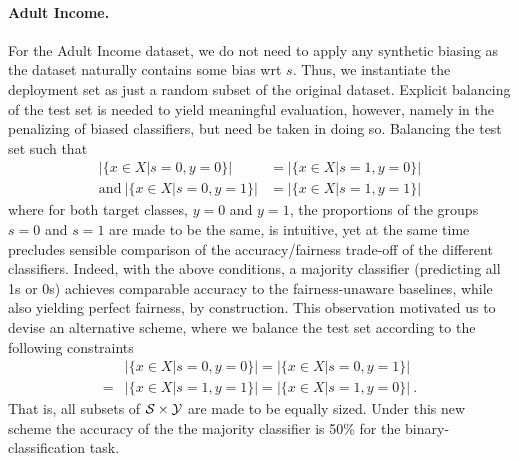 \paragraph{Adult Income.}\label{ssec:dataset-construction-adult}
For the Adult Income dataset, we do not need to apply any synthetic biasing as the dataset naturally contains some bias wrt $s$. Thus, we instantiate the deployment set as just a random subset of the original dataset. Explicit balancing of the test set is needed to yield meaningful evaluation, however, namely in the penalizing of biased classifiers, but need be taken in doing so. Balancing the test set such that
\begin{align}
    |\{x \in X |s=0, y=0\}| &= |\{x \in X |s=1, y=0\}|    \nonumber\\
    \text{and}~|\{x \in X |s=0, y=1\}| &= |\{x \in X |s=1, y=1\}|
\end{align}
where for both target classes, $y=0$ and $y=1$, the proportions of the groups $s=0$ and $s=1$ are made to be the same, is intuitive, yet at the same time precludes sensible comparison of the accuracy/fairness trade-off of the different classifiers.
Indeed, with the above conditions, a majority classifier (predicting all 1s or 0s) achieves comparable accuracy to the fairness-unaware baselines, while also yielding perfect fairness, by construction.
This observation motivated us to devise an alternative scheme, where we balance the test set according to the following constraints
\begin{align}
    & |\{x \in X |s=0, y=0\}| 
    = |\{x \in X |s=0, y=1\}|  \nonumber \\
    = &|\{x \in X |s=1, y=1\}|
    = |\{x \in X |s=1, y=0\}|~.
 \end{align}
That is, all subsets of ${\mathcal{S}} \times {\mathcal{Y}}$ are made to be equally sized. Under this new scheme the accuracy of the the majority classifier is 50\% for the binary-classification task.


